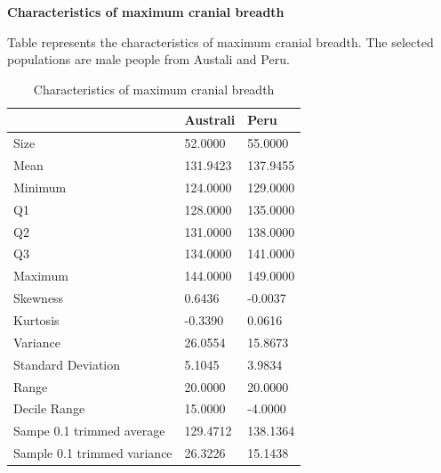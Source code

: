 \documentclass[12pt, oneside]{report}\usepackage[]{graphicx}\usepackage[]{color}
\begin{document}
\begin{center}
\textbf {Characteristics of maximum cranial breadth} \\
\end{center}
Table represents the characteristics of maximum cranial breadth. The selected populations are male people from Austali and Peru.
\begin{table}[ht]
\centering
\begin{tabular}{|l|l|l|}
  \hline
 & Australi & Peru \\ 
  \hline
Size &  52.0000 &  55.0000 \\ 
  Mean & 131.9423 & 137.9455 \\ 
  Minimum & 124.0000 & 129.0000 \\ 
  Q1 & 128.0000 & 135.0000 \\ 
  Q2 & 131.0000 & 138.0000 \\ 
  Q3 & 134.0000 & 141.0000 \\ 
  Maximum & 144.0000 & 149.0000 \\ 
  Skewness &   0.6436 &  -0.0037 \\ 
  Kurtosis &  -0.3390 &   0.0616 \\ 
  Variance &  26.0554 &  15.8673 \\ 
  Standard Deviation &   5.1045 &   3.9834 \\ 
  Range &  20.0000 &  20.0000 \\ 
  Decile Range &  15.0000 &  -4.0000 \\ 
  Sampe 0.1 trimmed average & 129.4712 & 138.1364 \\ 
  Sample 0.1 trimmed variance &  26.3226 &  15.1438 \\ 
   \hline
\end{tabular}
\caption{Characteristics of maximum cranial breadth} 
\end{table}
\end{document}
